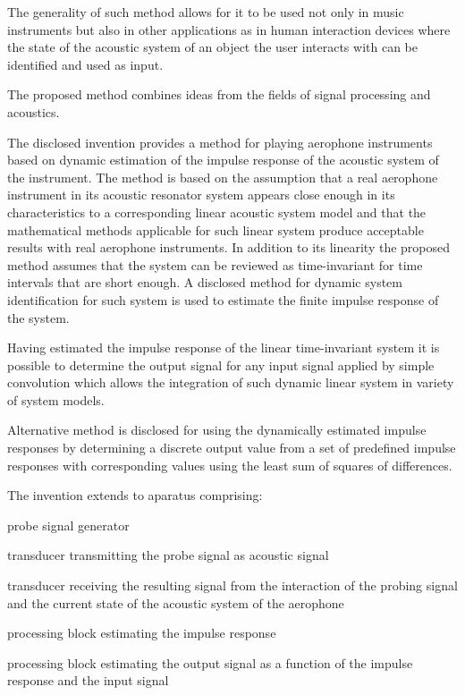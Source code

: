 \pa
The generality of such method allows for it to be used not only in music instruments but also in other applications as in human interaction devices where the state of the acoustic system of an object the user interacts with can be identified and used as input.

\pa
The proposed method combines ideas from the fields of signal processing and acoustics. 



\pa
The disclosed invention provides a method for playing aerophone instruments based on dynamic estimation of the impulse response of the acoustic system of the instrument. The method is based on the assumption that a real aerophone instrument in its acoustic resonator system appears close enough in its characteristics to a corresponding linear acoustic system model and that the mathematical methods applicable for such linear system produce acceptable results with real aerophone instruments. In addition to its linearity the proposed method assumes that the system can be reviewed as time-invariant for time intervals that are short enough. A disclosed method for dynamic system identification for such system is used to estimate the finite impulse response of the system.

\pa
Having estimated the impulse response of the linear time-invariant system it is possible to determine the output signal for any input signal applied by simple convolution which allows the integration of such dynamic linear system in variety of system models.

\pa
Alternative method is disclosed for using the dynamically estimated impulse responses by determining a discrete output value from a set of predefined impulse responses with corresponding values using the least sum of squares of differences.

\pa
The invention extends to aparatus comprising:

\pa
probe signal generator

\pa
transducer transmitting the probe signal as acoustic signal

\pa
transducer receiving the resulting signal from the interaction of the probing signal and the current state of the acoustic system of the aerophone

\pa
processing block estimating the impulse response

\pa
processing block estimating the output signal as a function of the impulse response and the input signal

